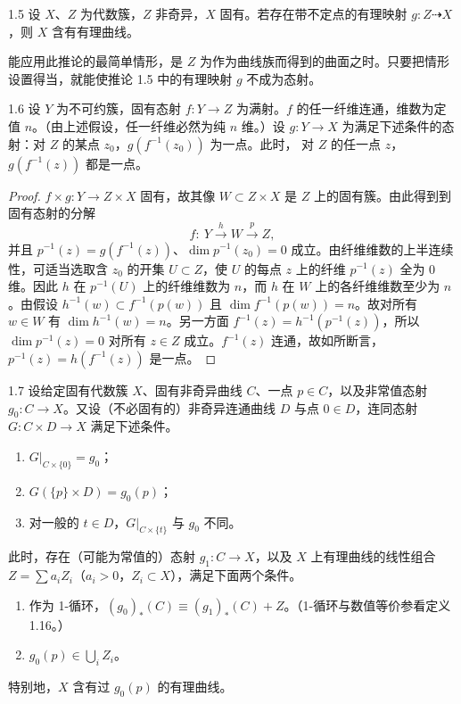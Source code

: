 \begin{corollary}{1.5}
设 $X$、$Z$ 为代数簇，$Z$ 非奇异，$X$ 固有。若存在带不定点的有理映射 $g: Z\dashrightarrow X$，则 $X$ 含有有理曲线。
\end{corollary}

能应用此推论的最简单情形，是 $Z$ 为作为曲线族而得到的曲面之时。只要把情形设置得当，就能使推论 1.5 中的有理映射 $g$ 不成为态射。

\begin{lemmap}{1.6}
设 $Y$ 为不可约簇，固有态射 $f:Y\to Z$ 为满射。$f$ 的任一纤维连通，维数为定值 $n$。（由上述假设，任一纤维必然为纯 $n$ 维。）设 $g:Y\to X$ 为满足下述条件的态射：对 $Z$ 的某点 $z_0$，$g(f^{-1}(z_0))$ 为一点。此时，
对 $Z$ 的任一点 $z$，$g(f^{-1}(z))$ 都是一点。
\end{lemmap}

\begin{proof}
$f\times g: Y\to Z\times X$ 固有，故其像 $W\subset Z\times X$ 是 $Z$ 上的固有簇。由此得到到固有态射的分解
\[ f:\ Y\xrightarrow{h}W\xrightarrow{p}Z, \]
并且 $p^{-1}(z)=g(f^{-1}(z))$、$\dim p^{-1}(z_0)=0$ 成立。由纤维维数的上半连续性，可适当选取含 $z_0$ 的开集 $U\subset Z$，使 $U$ 的每点 $z$ 上的纤维 $p^{-1}(z)$ 全为 0 维。因此 $h$ 在 $p^{-1}(U)$ 上的纤维维数为 $n$，而 $h$ 在 $W$ 上的各纤维维数至少为 $n$。由假设 $h^{-1}(w)\subset f^{-1}(p(w))$ 且 $\dim f^{-1}(p(w))=n$。故对所有 $w\in W$ 有 $\dim h^{-1}(w)=n$。另一方面 $f^{-1}(z)=h^{-1}(p^{-1}(z))$，所以 $\dim p^{-1}(z)=0$ 对所有 $z\in Z$ 成立。$f^{-1}(z)$ 连通，故如所断言，$p^{-1}(z)=h(f^{-1}(z))$ 是一点。
\end{proof}


\begin{corollary*}{1.7}
设给定固有代数簇 $X$、固有非奇异曲线 $C$、一点 $p\in C$，以及非常值态射 $g_0: C\to X$。又设（不必固有的）非奇异连通曲线 $D$ 与点 $0\in D$，连同态射 $G: C\times D\to X$ 满足下述条件。
\begin{enumerate}[label=(\arabic*),leftmargin=2.4em,itemsep=1pt,topsep=2pt]
\item $G|_{C\times\{0\}}=g_0$；
\item $G(\{p\}\times D)=g_0(p)$；
\item 对一般的 $t\in D$，$G|_{C\times\{t\}}$ 与 $g_0$ 不同。
\end{enumerate}
此时，存在（可能为常值的）态射 $g_1: C\to X$，以及 $X$ 上有理曲线的线性组合 $Z=\sum a_iZ_i$（$a_i>0$，$Z_i\subset X$），满足下面两个条件。
\begin{enumerate}[label=(\arabic*),leftmargin=2.4em,itemsep=1pt,topsep=2pt]
\item 作为 1-循环，$(g_0)_*(C)\equiv (g_1)_*(C)+Z$。（1-循环与数值等价参看定义 1.16。）
\item $g_0(p)\in\bigcup_i Z_i$。
\end{enumerate}
特别地，$X$ 含有过 $g_0(p)$ 的有理曲线。
\end{corollary*}

